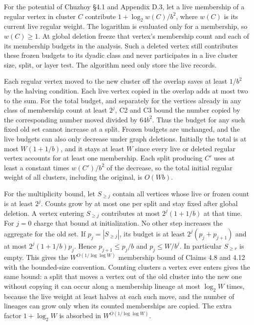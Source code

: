 \documentclass[11pt]{article}
\begin{document}
For the potential of Chuzhoy §4.1 and Appendix D.3, let a live membership of a regular vertex in cluster \(C\) contribute \(1+\log_2 w(C)/b^2\), where \(w(C)\) is its current live regular weight. The logarithm is evaluated only for a membership, so \(w(C)\ge1\). At global deletion freeze that vertex's membership count and each of its membership budgets in the analysis. Such a deleted vertex still contributes these frozen budgets to its dyadic class and never participates in a live cluster size, split, or layer test. The algorithm need only store the live records.

Each regular vertex moved to the new cluster off the overlap saves at least \(1/b^2\) by the halving condition. Each live vertex copied in the overlap adds at most two to the sum. For the total budget, and separately for the vertices already in any class of membership count at least \(2^j\), C2 and C3 bound the number copied by the corresponding number moved divided by \(64b^2\). Thus the budget for any such fixed old set cannot increase at a split. Frozen budgets are unchanged, and the live budgets can also only decrease under graph deletions. Initially the total is at most \(W(1+1/b)\), and it stays at least \(W\) since every live or deleted regular vertex accounts for at least one membership. Each split producing \(C'\) uses at least a constant times \(w(C')/b^2\) of the decrease, so the total initial regular weight of all clusters, including the original, is \(O(Wb)\).

For the multiplicity bound, let \(S_{\ge j}\) contain all vertices whose live or frozen count is at least \(2^j\). Counts grow by at most one per split and stay fixed after global deletion. A vertex entering \(S_{\ge j}\) contributes at most \(2^j(1+1/b)\) at that time. For \(j=0\) charge that bound at initialization. No other step increases the aggregate for the old set. If \(p_j=|S_{\ge j}|\), its budget is at least \(2^j(p_j+p_{j+1})\) and at most \(2^j(1+1/b)p_j\). Hence \(p_{j+1}\le p_j/b\) and \(p_j\le W/b^j\). In particular \(S_{\ge r}\) is empty. This gives the \(W^{O(1/\log\log W)}\) membership bound of Claims 4.8 and 4.12 with the bounded-size convention. Counting clusters a vertex ever enters gives the same bound: a split that moves a vertex out of the old cluster into the new one without copying it can occur along a membership lineage at most \(\log_2 W\) times, because the live weight at least halves at each such move, and the number of lineages can grow only when its counted memberships are copied. The extra factor \(1+\log_2 W\) is absorbed in \(W^{O(1/\log\log W)}\).
\end{document}
